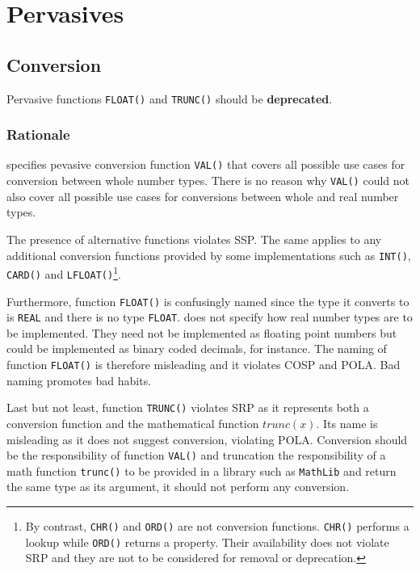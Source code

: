 \documentclass[10pt,a4paper]{article} %
\begin{document}
\section{Pervasives}

\subsection{Conversion}

Pervasive functions \verb|FLOAT()| and \verb|TRUNC()| should be \textbf{deprecated}.

\subsubsection{Rationale}

\cite{Wirth88} specifies pevasive conversion function \verb|VAL()| that covers all possible use cases for conversion between whole number types. There is no reason why \verb|VAL()| could not also cover all possible use cases for conversions between whole and real number types.

The presence of alternative functions violates SSP. The same applies to any additional conversion functions provided by some implementations such as \verb|INT()|, \verb|CARD()| and \verb|LFLOAT()|\footnote{By contrast, \texttt{CHR()} and \texttt{ORD()} are not conversion functions. \texttt{CHR()} performs a lookup while \texttt{ORD()} returns a property. Their availability does not violate SRP and they are not to be considered for removal or deprecation.}.
 
Furthermore, function \verb|FLOAT()| is confusingly named since the type it converts to is \verb|REAL| and there is no type \verb|FLOAT|. \cite{Wirth88} does not specify how real number types are to be implemented. They need not be implemented as floating point numbers but could be implemented as binary coded decimals, for instance. The naming of function \verb|FLOAT()| is therefore misleading and it violates COSP and POLA. Bad naming promotes bad habits.

Last but not least, function \verb|TRUNC()| violates SRP \cite{Martin03} as it represents both a conversion function and the mathematical function $trunc(x)$. Its name is misleading as it does not suggest conversion, violating POLA. Conversion should be the responsibility of function \verb|VAL()| and truncation the responsibility of a math function \verb|trunc()| to be provided in a library such as \verb|MathLib| and return the same type as its argument, it should not perform any conversion.
\end{document}
